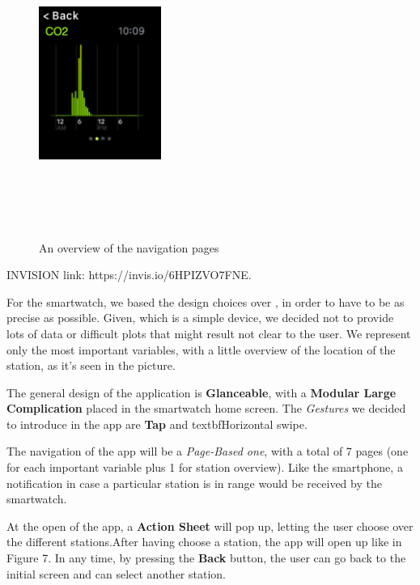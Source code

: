 \documentclass[12pt]{article} %
\begin{document}
\begin{figure}[H]
  \includegraphics[width=4cm,height=10cm,keepaspectratio]{img/histoAW.png}
  \hfill
  \caption{An overview of the navigation pages}
  \label{fig:boat1}
\end{figure}
INVISION link: https://invis.io/6HPIZVO7FNE.

For the smartwatch, we based the design choices over \cite{apple}, in order to have to be as precise as possible.
Given, which is a simple device, we decided not to provide lots of data or difficult plots that might result not clear to the user.
We represent only the most important variables, with a little overview of the location of the station, as it's seen in the picture.

The general design of the application is \textbf{Glanceable}, with a \textbf{Modular Large Complication} placed in the smartwatch home screen.
The \textit{Gestures} we decided to introduce in the app are \textbf{Tap} and textbf{Horizontal swipe}.

The navigation of the app will be a \textit{Page-Based one}, with a total of 7 pages (one for each important variable plus 1 for station overview).
Like the smartphone, a notification in case a particular station is in range would be received by the smartwatch.

At the open of the app, a \textbf{Action Sheet} will pop up, letting the user choose over the different stations.After having choose a station, the app will open up like in Figure 7.
In any time, by pressing the \textbf{Back} button, the user can go back to the initial screen and can select another station.
\end{document}

